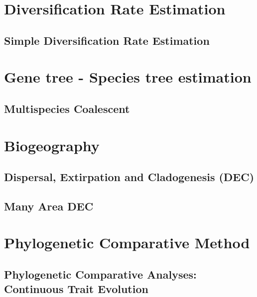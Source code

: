 \documentclass[11pt]{book}
\begin{document}
\part{Diversification Rate Estimation}
\chapter{Simple Diversification Rate Estimation}
\def \ResourcePath {RB_SimpleDiversification_Tutorial/}






\part{Gene tree - Species tree estimation}
\chapter{Multispecies Coalescent}
\def \ResourcePath {RB_MultispeciesCoalescent_Tutorial/}







\part{Biogeography}

\chapter{Dispersal, Extirpation and Cladogenesis (DEC)}
\def \ResourcePath {RB_Biogeography_DEC_Tutorial/}


\chapter{Many Area DEC}
\def \ResourcePath {RB_Biogeography_many_area_Tutorial/}








\part{Phylogenetic Comparative Method}
\chapter{Phylogenetic Comparative Analyses: Continuous Trait Evolution}
\def \ResourcePath {RB_PhyloComparative_Tutorial/}

\end{document}
